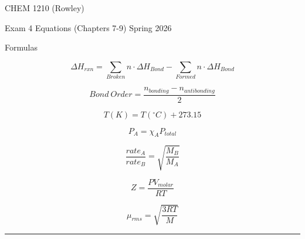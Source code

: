 \documentclass[12pt, addpoints, letterpaper]{exam}
\begin{document}
\begin{center}
	\vspace{12em}
	{\Huge CHEM 1210 (Rowley) }

	{\LARGE Exam 4 Equations (Chapters 7-9) Spring 2026}
\end{center}


\begin{center}
	{\large Formulas}

	\hrulefill
\end{center}

\noindent
\begin{minipage}[c][\stretch{1}][c]{0.56\linewidth}
	\begin{equation*}
		\Delta H_{rxn}=\sum\limits_{Broken} n\cdot \Delta H_{Bond} - \sum\limits_{Formed}n\cdot \Delta H_{Bond}
	\end{equation*}

	\begin{equation*}
		Bond~Order=\frac{n_{bonding}-n_{antibonding}}{2}
	\end{equation*}

	\begin{equation*}
		T(K) = T(^\circ C) + 273.15
	\end{equation*}

	\begin{equation*}
		P_A=\chi_AP_{total}
	\end{equation*}

	\begin{equation*}
		\frac{rate_A}{rate_B}=\sqrt{\dfrac{M_B}{M_A}}
	\end{equation*}

	\begin{equation*}
		Z = \frac{PV_{molar}}{RT}
	\end{equation*}

	\begin{equation*}
		\mu_{rms} = \sqrt{\frac{3RT}{M}}
	\end{equation*}
\end{minipage}
\rule[-190pt]{1.5pt}{380pt}
\end{document}
